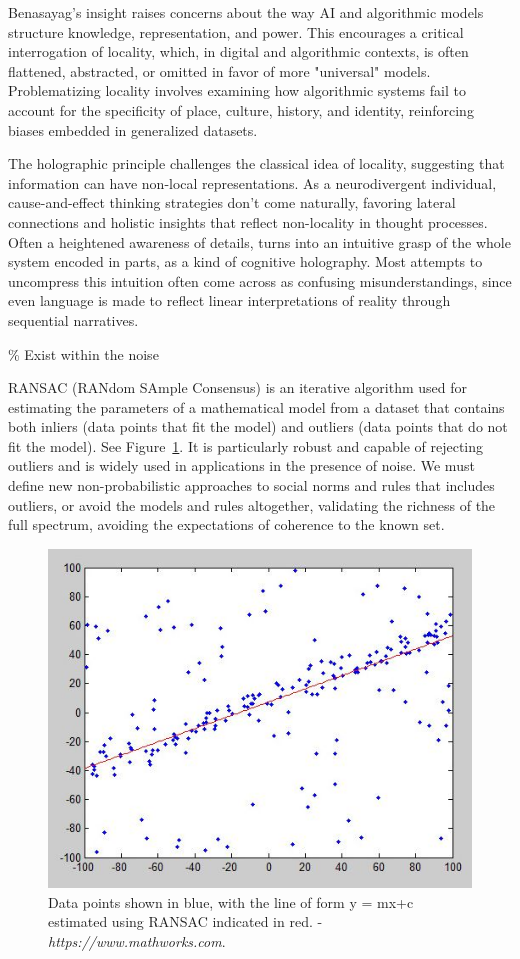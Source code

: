 Benasayag's insight raises concerns about the way AI and algorithmic models structure knowledge, representation, and power. This encourages a critical interrogation of locality, which, in digital and algorithmic contexts, is often flattened, abstracted, or omitted in favor of more "universal" models. Problematizing locality involves examining how algorithmic systems fail to account for the specificity of place, culture, history, and identity, reinforcing biases embedded in generalized datasets.

The holographic principle challenges the classical idea of locality, suggesting that information can have non-local representations. As a neurodivergent individual, cause-and-effect thinking strategies don't come naturally, favoring lateral connections and holistic insights that reflect non-locality in thought processes. Often a heightened awareness of details, turns into an intuitive grasp of the whole system encoded in parts, as a kind of cognitive holography. Most attempts to uncompress this intuition often come across as confusing misunderstandings, since even language is made to reflect linear interpretations of reality through sequential narratives.

{\scriptsize \textcolor{comment}{\% Exist within the noise }}

RANSAC (RANdom SAmple Consensus) is an iterative algorithm used for estimating the parameters of a mathematical model from a dataset that contains both inliers (data points that fit the model) and outliers (data points that do not fit the model). See Figure~\ref{fig:ransac}. It is particularly robust and capable of rejecting outliers and is widely used in applications in the presence of noise. We must define new non-probabilistic approaches to social norms and rules that includes outliers, or avoid the models and rules altogether, validating the richness of the full spectrum, avoiding the expectations of coherence to the known set. 

\begin{figure}
    \centering
    \includegraphics[width=0.8\linewidth]{assets/ransac.jpg} 
    \caption{\small Data points shown in blue, with the line of form y = mx+c estimated using RANSAC indicated in red. - \textit{https://www.mathworks.com}.}
    \label{fig:ransac}
\end{figure}

